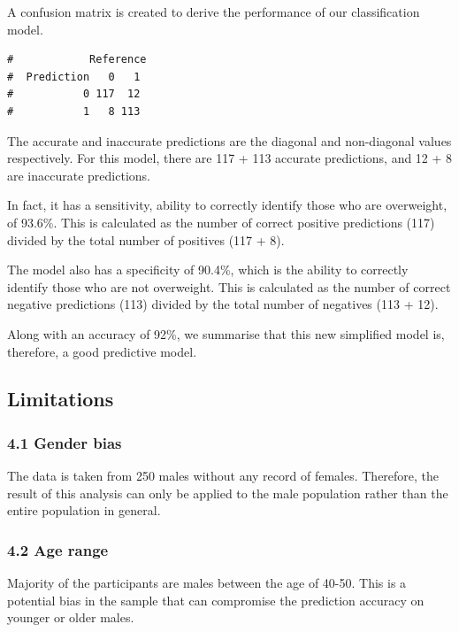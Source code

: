 \documentclass[a4paper,9pt,twocolumn,twoside,]{pinp}
\begin{document}
A confusion matrix is created to derive the performance of our
classification model.

\begin{ShadedResult}
\begin{verbatim}
#            Reference
#  Prediction   0   1
#           0 117  12
#           1   8 113
\end{verbatim}
\end{ShadedResult}

The accurate and inaccurate predictions are the diagonal and
non-diagonal values respectively. For this model, there are 117 + 113
accurate predictions, and 12 + 8 are inaccurate predictions.

In fact, it has a sensitivity, ability to correctly identify those who
are overweight, of 93.6\%. This is calculated as the number of correct
positive predictions (117) divided by the total number of positives (117
+ 8).

The model also has a specificity of 90.4\%, which is the ability to
correctly identify those who are not overweight. This is calculated as
the number of correct negative predictions (113) divided by the total
number of negatives (113 + 12).

Along with an accuracy of 92\%, we summarise that this new simplified
model is, therefore, a good predictive model.

\hypertarget{limitations}{%
\subsection{Limitations}\label{limitations}}

\hypertarget{gender-bias}{%
\subsubsection{4.1 Gender bias}\label{gender-bias}}

The data is taken from 250 males without any record of females.
Therefore, the result of this analysis can only be applied to the male
population rather than the entire population in general.

\hypertarget{age-range}{%
\subsubsection{4.2 Age range}\label{age-range}}

Majority of the participants are males between the age of 40-50. This is
a potential bias in the sample that can compromise the prediction
accuracy on younger or older males.
\end{document}
